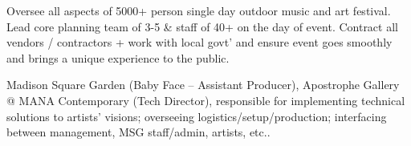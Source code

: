 \documentclass[]{deedy-resume-openfont}
\begin{document}
\begin{minipage}[t]{0.58\textwidth}

Oversee all aspects of 5000+ person single day outdoor music and art festival. Lead core planning team of 3-5 \& staff of 40+ on the day of event. Contract all vendors / contractors + work with local govt' and ensure event goes smoothly and brings a unique experience to the public.
\sectionseplg


Madison Square Garden (Baby Face – Assistant Producer), Apostrophe Gallery @ MANA Contemporary (Tech Director), responsible for implementing technical solutions to artists’ visions; overseeing logistics/setup/production; interfacing between management, MSG staff/admin, artists, etc..
\sectionseplg
\sectionseplg
\begin{flushright} 
    \scalebox{0.65}{(last compiled \today)} 
\end{flushright}

\end{minipage}
\end{document}
